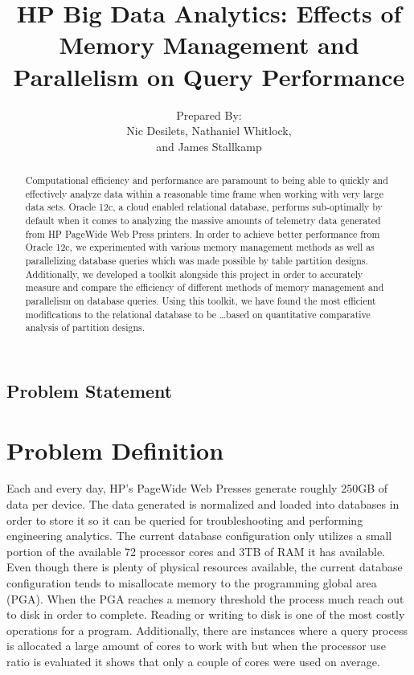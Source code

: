 \documentclass[letterpaper, 10pt]{article}
\title{\huge HP Big Data Analytics: Effects of Memory Management and Parallelism on Query Performance}
\author{Prepared By:\\Nic Desilets, Nathaniel Whitlock,\\ and James Stallkamp}
\begin{document}
\begin{titlingpage}
    \maketitle
    
    \begin{abstract}
		Computational efficiency and performance are paramount to 			    being able to quickly and effectively analyze data within a 			reasonable time frame when working with very large data 				sets. Oracle 12c, a cloud enabled relational database, 					performs sub-optimally by default when it comes to analyzing 		the massive amounts of telemetry data generated from HP 				PageWide Web Press printers. In order to achieve better 				performance from Oracle 12c, we experimented with various 				memory management methods as well as parallelizing database 			queries which was made possible by table partition designs. 			Additionally, we developed a toolkit alongside this project 			in order to accurately measure and compare the efficiency of 		different methods of memory management and parallelism on 				database queries. Using this toolkit, we have found the most 		efficient modifications to the relational database to be 				\ldots based on quantitative comparative analysis of 					partition designs.
    \end{abstract}
\end{titlingpage}


\begin{center}
	\section*{\huge Problem Statement}
\end{center}

\section*{Problem Definition}
Each and every day, HP’s PageWide Web Presses generate roughly 250GB of data per device. The data generated is normalized and loaded into databases in order to store it so it can be queried for troubleshooting and performing engineering analytics. The current database configuration only utilizes a small portion of the available 72 processor cores and 3TB of RAM it has available. Even though there is plenty of physical resources available, the current database configuration tends to misallocate memory to the programming global area (PGA). When the PGA reaches a memory threshold the process much reach out to disk in order to complete. Reading or writing to disk is one of the most costly operations for a program. Additionally, there are instances where a query process is allocated a large amount of cores to work with but when the processor use ratio is evaluated it shows that only a couple of cores were used on average.
\end{document}
